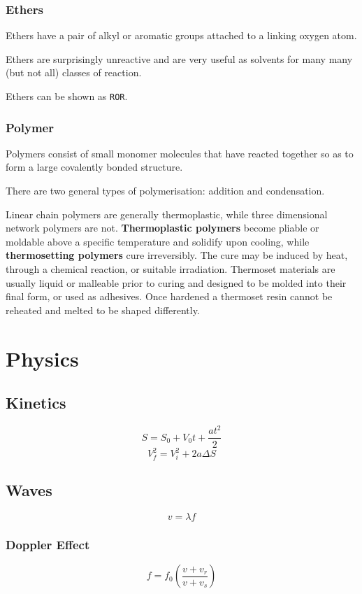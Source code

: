 \documentclass[oneside]{book}
\begin{document}
\section{Ethers}
Ethers have a pair of alkyl or aromatic groups attached to a linking oxygen
atom.

Ethers are surprisingly unreactive and are very useful as solvents for many many
(but not all) classes of reaction.

Ethers can be shown as \texttt{ROR}.

\section{Polymer}
Polymers consist of small monomer molecules that have reacted together so as to
form a large covalently bonded structure.

There are two general types of polymerisation: addition and condensation.

Linear chain polymers are generally thermoplastic, while three dimensional
network polymers are not. \textbf{Thermoplastic polymers} become pliable or
moldable above a specific temperature and solidify upon cooling, while
\textbf{thermosetting polymers} cure irreversibly. The cure may be induced by
heat, through a chemical reaction, or suitable irradiation. Thermoset materials
are usually liquid or malleable prior to curing and designed to be molded into
their final form, or used as adhesives. Once hardened a thermoset resin cannot
be reheated and melted to be shaped differently.

\part{Physics}

\chapter{Kinetics}
\[S = S_0 + V_0 t + \frac{a t^2}{2}\]
\[V_f^2 = V_i^2 + 2 a \Delta S\]

\chapter{Waves}
\[v = \lambda f\]

\section{Doppler Effect}
\[f = f_0 \left ( \frac{v + v_r}{v + v_s} \right )\]
\end{document}
